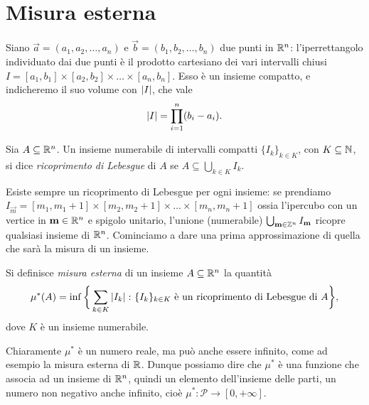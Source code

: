 \section{Misura esterna}
\label{sec:misura-esterna}
Siano $\vec a=(a_1,a_2,\dots,a_n)$ e $\vec b=(b_1,b_2,\dots,b_n)$ due punti in $\mathbb{R}^n$: l'iperrettangolo individuato dai due punti è il prodotto cartesiano dei vari intervalli chiusi $I=[a_1,b_1]\times[a_2,b_2]\times\dots\times[a_n,b_n]$.
Esso è un insieme compatto, e indicheremo il suo volume con $\left|{I}\right|$, che vale
\begin{equation*}
	\left|{I}\right|=\prod_{i=1}^n(b_i-a_i).
\end{equation*}
\begin{definizione} \label{d:ricoprimento-lebesgue}
	Sia $A\subseteq\mathbb{R}^n$.
	Un insieme numerabile di intervalli compatti $\{I_k\}_{k\in K}$, con $K\subseteq\mathbb{N}$, si dice \emph{ricoprimento di Lebesgue} di $A$ se $A\subseteq\bigcup_{k\in K}I_k$.
\end{definizione}
Esiste sempre un ricoprimento di Lebesgue per ogni insieme: se prendiamo $I_{\vec m}=[m_1,m_1+1]\times[m_2,m_2+1]\times\dots\times[m_n,m_n+1]$ ossia l'ipercubo con un vertice in $\mathbf{m}\in\mathbb{R}^n$ e spigolo unitario, l'unione (numerabile) $\bigcup_{\mathbf{m}\in\mathbb{Z}^n}I_{\mathbf{m}}$ ricopre qualsiasi insieme di $\mathbb{R}^n$.
Cominciamo a dare una prima approssimazione di quella che sarà la misura di un insieme.
\begin{definizione} \label{d:misura-esterna}
	Si definisce \emph{misura esterna} di un insieme $A\subseteq\mathbb{R}^n$ la quantità
	\begin{equation*}
		\mu^*(A)=\inf\bigg\{\sum_{k\in K}\left|{I_k}\right|\colon\{I_k\}_{k\in K}\text{ è un ricoprimento di Lebesgue di }A\bigg\},
	\end{equation*}
	dove $K$ è un insieme numerabile.
\end{definizione}
Chiaramente $\mu^*$ è un numero reale, ma può anche essere infinito, come ad esempio la misura esterna di $\mathbb{R}$.
Dunque possiamo dire che $\mu^*$ è una funzione che associa ad un insieme di $\mathbb{R}^n$, quindi un elemento dell'insieme delle parti, un numero non negativo anche infinito, cioè $\mu^*\colon\mathcal P\to[0,+\infty]$.


